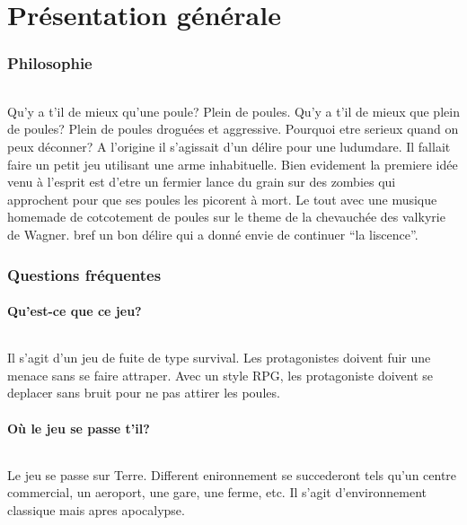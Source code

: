 \documentclass[a4paper,10pt]{article}
\title{}
\author{}
\date{}
\begin{document}
\maketitle


\part{Présentation générale} %

	\section{Philosophie} %
		\paragraph{} Qu'y a t'il de mieux qu'une poule? Plein de poules. Qu'y a 
t'il de mieux que plein de poules? Plein de poules droguées et aggressive. 
Pourquoi etre serieux quand on peux déconner? A l'origine il s'agissait d'un 
délire pour une ludumdare. Il fallait faire un petit jeu utilisant une arme 
inhabituelle. Bien evidement la premiere idée venu à l'esprit est d'etre un 
fermier lance du grain sur des zombies qui approchent pour que ses poules les 
picorent à mort. Le tout avec une musique homemade de cotcotement de poules sur 
le theme de la chevauchée des valkyrie de Wagner. bref un bon délire qui a donné 
envie de continuer ``la liscence''. 
	\section{Questions fréquentes}%
		\subsection{Qu'est-ce que ce jeu?}
			\paragraph{} Il s'agit d'un jeu de fuite de type survival. Les 
protagonistes doivent fuir une menace sans se faire attraper. Avec un style
RPG, les protagoniste doivent se deplacer sans bruit pour ne pas attirer les
poules.

		\subsection{Où le jeu se passe t'il?}
			\paragraph{} Le jeu se passe sur Terre. Different enironnement se 
	succederont tels qu'un centre commercial, un aeroport, une gare, une 
ferme, etc. Il s'agit 	d'environnement classique mais apres apocalypse. 
\end{document}
